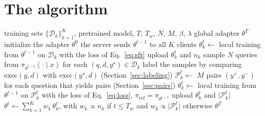 \section{The algorithm}\label{sup:algorithm}

\begin{algorithm}[!ht]
\caption{\method}\label{alg:method}
\begin{algorithmic}[1]
\Require training sets $\{\mathcal{D}_k\}_{k=1}^{K}$, pretrained model,
  $T$, $T_w$, $N$, $M$, $\beta$, $\lambda$
\Ensure global adapter $\theta^{T}$
\State initialize the adapter $\theta^{0}$
  \State the server sends $\theta^{t-1}$ to all $K$ clients
     
      \State $\theta_k^{t} \gets$ local training from $\theta^{t-1}$ on
        $\mathcal{D}_k$ with the loss of Eq.~\eqref{eq:sft}
      \State upload $\theta_k^{t}$ and $n_k$
    \Else {}
      \State sample $N$ queries from $\pi_{\theta^{t-1}}(\cdot \mid x)$
        for each $(q, d, y^\star) \in \mathcal{D}_k$
      \State label the samples by comparing $\mathrm{exec}(y, d)$
        with $\mathrm{exec}(y^\star, d)$
        (Section~\ref{sec:labeling})
      \State $\mathcal{P}_k^{t} \gets$ $M$ pairs $(y^{+}, y^{-})$ for
        each question that yields pairs (Section~\ref{sec:pairs})
        \State $\theta_k^{t} \gets$ local training from $\theta^{t-1}$
          on $\mathcal{P}_k^{t}$ with the loss of Eq.~\eqref{eq:loss},
          $\pi_{\mathrm{ref}} = \pi_{\theta^{t-1}}$
        \State upload $\theta_k^{t}$ and $\lvert\mathcal{P}_k^{t}\rvert$
      \EndIf
    \EndIf
  \EndFor
  \State $\theta^{t} \gets \sum_{k=1}^{K} w_k \, \theta_k^{t}$, with
    $w_k \propto n_k$ if $t \le T_w$ and
    $w_k \propto \lvert\mathcal{P}_k^{t}\rvert$ otherwise
\EndFor
\State \Return $\theta^{T}$
\end{algorithmic}
\end{algorithm}
